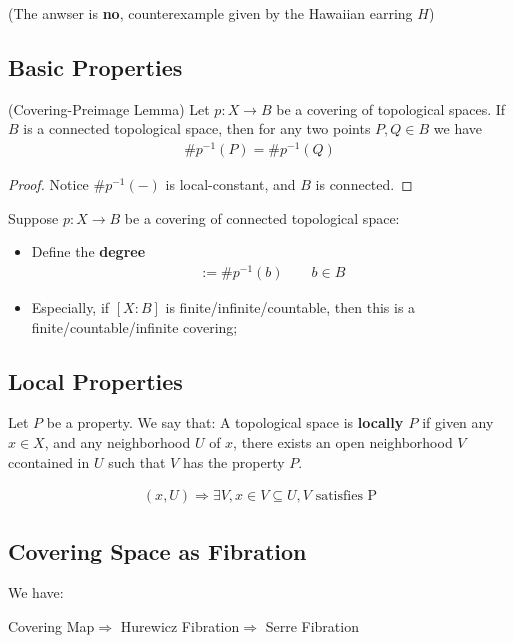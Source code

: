 \documentclass[Total.tex]{subfiles}
\begin{document}
			
			(The anwser is \textbf{no}, counterexample given by the Hawaiian earring $H$)
			\subsection{Basic Properties}
			
			\begin{lemma}
				(Covering-Preimage Lemma) Let $p:X\rightarrow B$ be a covering of topological spaces. If $B$ is a connected topological space, then for any two points $P,Q\in B$ we have
				\begin{gather*}
					\# p^{-1}(P)=\#p^{-1}(Q)
				\end{gather*}
			\end{lemma}
			\begin{proof}
				Notice $\#p^{-1}(-)$ is local-constant, and $B$ is connected.
			\end{proof}
			
			\begin{Def} Suppose $p:X\rightarrow B$ be a covering of connected topological space:
				\begin{itemize}
					\item Define the \textbf{degree}
					\begin{gather*}
						[X:B]:=\#p^{-1}(b)\qquad b\in B
					\end{gather*}
					\item Especially, if $[X:B]$ is finite/infinite/countable, then this is a finite/countable/infinite covering;
				\end{itemize}
			\end{Def}
			
			\subsection{Local Properties}
			\begin{Def}
				Let $P$ be a property. We say that: A topological space is \textbf{locally $P$} if given any $x\in X$, and any neighborhood $U$ of $x$, there exists an open neighborhood $V$ ccontained in $U$ such that $V$ has the property $P$.
				
				\begin{gather*}
					(x,U)\Rightarrow  \exists V,x\in V\subseteq U,V\mbox{ satisfies P}
				\end{gather*}
			\end{Def}
			\subsection{Covering Space as Fibration}
			We have:
			\begin{center}
				Covering Map$\Rightarrow$ Hurewicz Fibration$\Rightarrow$ Serre Fibration
			\end{center}
\end{document}

